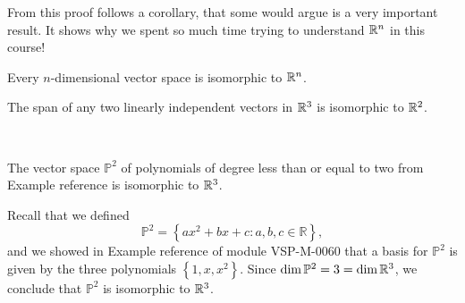 \documentclass{ximera}
\begin{document}
From this proof follows a corollary, that some would argue is a very important result.  It shows why we spent so much time trying to understand $\mathbb{R}^n$ in this course!

\begin{corollary}\label{cor:ndimisotorn}
Every $n$-dimensional vector space is isomorphic to $\mathbb{R}^n$.
\end{corollary}

\begin{example}
The span of any two linearly independent vectors in $\mathbb{R}^3$ is isomorphic to $\mathbb{R}^2$. %


\begin{image}
~~~~~~~~~~~~~
  \label{fig:planeisoplane} 
  \end{image}

\end{example}

\begin{example}
The vector space $\mathbb{P}^2$ of polynomials of degree less than or equal to two from Example {\color{red} reference} is isomorphic to $\mathbb{R}^3$.
\end{example}

\begin{explanation}
Recall that we defined $$\mathbb{P}^2=\left\{ax^2+bx+c : a,b,c \in \mathbb{R} \right\},$$ and we showed in Example {\color{red} reference} of module VSP-M-0060 that a basis for $\mathbb{P}^2$ is given by the three polynomials $\left\{1,x,x^2\right\}$.  Since $\text{dim}\,\mathbb{P}^2=3=\text{dim}\,\mathbb{R}^3$, we conclude that $\mathbb{P}^2$ is isomorphic to $\mathbb{R}^3$.
\end{explanation}
\end{document}
